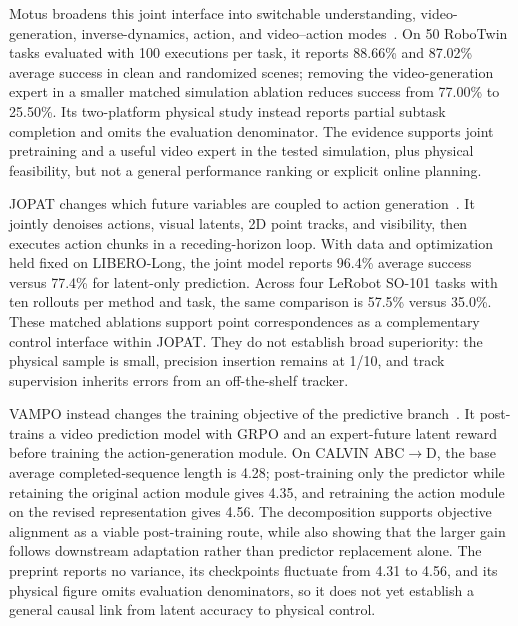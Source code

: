 Motus broadens this joint interface into switchable understanding, video-generation, inverse-dynamics, action, and video--action modes~\cite{bi2026motus}. On 50 RoboTwin tasks evaluated with 100 executions per task, it reports 88.66\% and 87.02\% average success in clean and randomized scenes; removing the video-generation expert in a smaller matched simulation ablation reduces success from 77.00\% to 25.50\%. Its two-platform physical study instead reports partial subtask completion and omits the evaluation denominator. The evidence supports joint pretraining and a useful video expert in the tested simulation, plus physical feasibility, but not a general performance ranking or explicit online planning.

JOPAT changes which future variables are coupled to action generation~\cite{guan2026jopat}. It jointly denoises actions, visual latents, 2D point tracks, and visibility, then executes action chunks in a receding-horizon loop. With data and optimization held fixed on LIBERO-Long, the joint model reports 96.4\% average success versus 77.4\% for latent-only prediction. Across four LeRobot SO-101 tasks with ten rollouts per method and task, the same comparison is 57.5\% versus 35.0\%. These matched ablations support point correspondences as a complementary control interface within JOPAT. They do not establish broad superiority: the physical sample is small, precision insertion remains at 1/10, and track supervision inherits errors from an off-the-shelf tracker.

VAMPO instead changes the training objective of the predictive branch~\cite{ge2026vampo}. It post-trains a video prediction model with GRPO and an expert-future latent reward before training the action-generation module. On CALVIN ABC$\rightarrow$D, the base average completed-sequence length is 4.28; post-training only the predictor while retaining the original action module gives 4.35, and retraining the action module on the revised representation gives 4.56. The decomposition supports objective alignment as a viable post-training route, while also showing that the larger gain follows downstream adaptation rather than predictor replacement alone. The preprint reports no variance, its checkpoints fluctuate from 4.31 to 4.56, and its physical figure omits evaluation denominators, so it does not yet establish a general causal link from latent accuracy to physical control.

